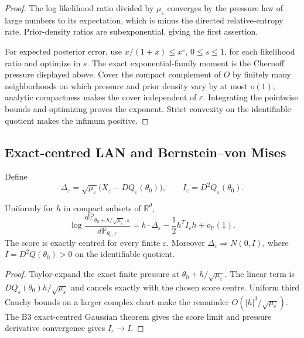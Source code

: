 \begin{proof}
The log likelihood ratio divided by \(\mu_\varepsilon\) converges by the
pressure law of large numbers to its expectation, which is minus the directed
relative-entropy rate.  Prior-density ratios are subexponential, giving the
first assertion.

For expected posterior error, use
\(x/(1+x)\le x^s\), \(0\le s\le1\), for each likelihood ratio and optimize in
\(s\).  The exact exponential-family moment is the Chernoff pressure displayed
above.  Cover the compact complement of \(O\) by finitely many neighborhoods
on which pressure and prior density vary by at most \(o(1)\); analytic
compactness makes the cover independent of \(\varepsilon\).  Integrating the
pointwise bounds and optimizing proves the exponent.  Strict convexity on the
identifiable quotient makes the infimum positive.
\end{proof}

\subsection{Exact-centred LAN and Bernstein--von Mises}

Define
\[
\Delta_\varepsilon=\sqrt{\mu_\varepsilon}
\bigl(X_\varepsilon-DQ_\varepsilon(\theta_0)\bigr),
\qquad
I_\varepsilon=D^2Q_\varepsilon(\theta_0).
\]

\begin{theorem}
\label{thm:r6-c1-lan}
Uniformly for \(h\) in compact subsets of \(\mathbb R^d\),
\[
\log\frac{d\mathbb P_{\theta_0+h/\sqrt{\mu_\varepsilon},\varepsilon}}
{d\mathbb P_{\theta_0,\varepsilon}}
=h\cdot\Delta_\varepsilon-\frac12h^TI_\varepsilon h+o_{\mathbb P}(1).
\]
The score is exactly centred for every finite \(\varepsilon\).  Moreover
\(\Delta_\varepsilon\Rightarrow N(0,I)\), where
\(I=D^2Q(\theta_0)>0\) on the identifiable quotient.
\end{theorem}

\begin{proof}
Taylor-expand the exact finite pressure at
\(\theta_0+h/\sqrt{\mu_\varepsilon}\).  The linear term is
\(DQ_\varepsilon(\theta_0)h/\sqrt{\mu_\varepsilon}\) and cancels exactly with
the chosen score centre.  Uniform third Cauchy bounds on a larger complex
chart make the remainder \(O(|h|^3/\sqrt{\mu_\varepsilon})\).  The B3
exact-centred Gaussian theorem gives the score limit and pressure derivative
convergence gives \(I_\varepsilon\to I\).
\end{proof}

